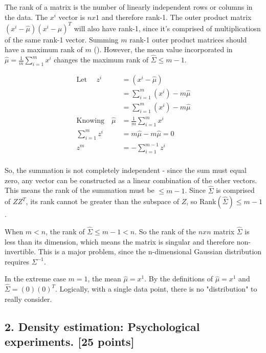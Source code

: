 \documentclass[twoside,12pt]{article}
\begin{document}
\begin{enumerate}[label*=\arabic*.]
The rank of a matrix is the number of linearly independent rows or columns in the data. The $x^i$ vector is $nx1$ and therefore rank-1. The outer product matrix $(x^i-\hat{\mu})(x^i-\hat{\mu})^T$ will also have rank-1, since it's comprised of multiplicatiosn of the same rank-1 vector. Summing $m$ rank-1 outer product matrices should have a maximum rank of $m$ (\cite{se180366}). However, the mean value incorporated in $\hat{\mu} = \frac{1}{m}\sum_{i=1}^m x^i$ changes the maximum rank of $\hat{\Sigma} \le m-1$.

\begin{align*}
    \text{Let } \quad z^i &= (x^i-\hat{\mu}) \\
     &= \sum_{i=1}^m(x^i) - m\hat{\mu} \\
     &= \sum_{i=1}^m(x^i) - m\hat{\mu} \\
     \text{Knowing} \quad \hat{\mu} &= \frac{1}{m}\sum_{i=1}^m x^i\\
     \sum_{i=1}^m z^i &= m\hat\mu - m\hat{\mu} = 0\\
     z^m &= -\sum_{i=1}^{m-1} z^i\\
\end{align*}

So, the summation is not completely independent - since the sum must equal zero, any vector can be constructed as a linear combination of the other vectors. This means the rank of the summation must be $\le m-1$. Since $\hat\Sigma$ is comprised of $ZZ^T$, its rank cannot be greater than the subspace of $Z$, so Rank$(\hat\Sigma) \le m-1$.

When $m<n$, the rank of $\hat\Sigma \le m-1 < n$. So the rank of the $nxn$ matrix $\hat\Sigma$ is less than its dimension, which means the matrix is singular and therefore non-invertible. This is a major problem, since the n-dimensional Gaussian distribution requires $\Sigma^{-1}$.

In the extreme case $m=1$, the mean $\hat\mu = x^1$. By the definitions of $\hat\mu = x^1$ and $\hat\Sigma=(0)(0)^T$. Logically, with a single data point, there is no "distribution" to really consider.

\end{enumerate}

\subsection*{2. Density estimation: Psychological experiments. [25 points]}
\end{document}
